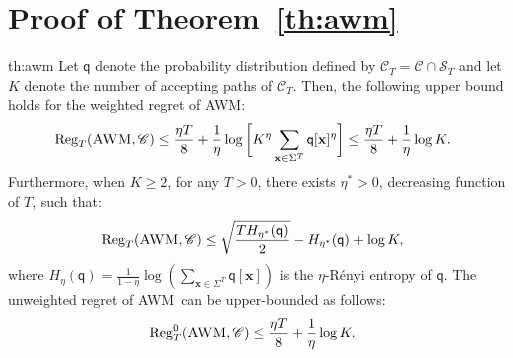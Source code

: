 \documentclass{article}
\newcommand{\sC}{\mathscr C}
\newcommand{\sS}{\mathscr S}
\newcommand{\bx}{{\mathbf x}}
\newcommand{\sfq}{{\mathsf q}}
\newcommand{\Reg}{\mathrm{Reg}}
\newcommand{\AWM}{\textsc{AWM}}
\begin{document}
\section{Proof of Theorem~\ref{th:awm}}
\label{app:awm}

\begin{reptheorem}{th:awm}
Let $\sfq$ denote the probability distribution defined by
$\sC_T = \sC \cap \sS_T$ and let $K$ denote the number of
accepting paths of $\sC_T$. Then, the following upper bound holds
for the weighted regret of \AWM:
\begin{align*}
  \Reg_T(\AWM, \sC) 
  & \leq \frac{\eta T}{8} + \frac{1}{\eta} \log \bigg[ K^\eta \sum_{\bx
    \in \Sigma^T} \sfq[\bx]^\eta \bigg]
    \leq \frac{\eta T}{8} + \frac{1}{\eta} \log K. 
\end{align*}
Furthermore, when $K \geq 2$, for any $T > 0$, there exists
$\eta^* > 0$, decreasing function of $T$, such that:
\begin{align*}
    \Reg_T(\AWM, \sC) 
    & \leq \sqrt{\frac{T H_{\eta^*}(\sfq)}{2}} - H_{\eta^*}(\sfq) + \log
    K,
\end{align*}
where
$H_\eta(\sfq) = \frac{1}{1 - \eta} \log\left(\sum_{\bx \in \Sigma^T}
  \sfq[\bx] \right)$ is the $\eta$-R\'{e}nyi entropy of $\sfq$.  The
unweighted regret of \AWM\ can be upper-bounded as follows:
\begin{align*}
  \Reg_T^0(\AWM, \sC) 
  & \leq \frac{\eta T}{8} + \frac{1}{\eta} \log K.
\end{align*}

\end{reptheorem}
\end{document}

